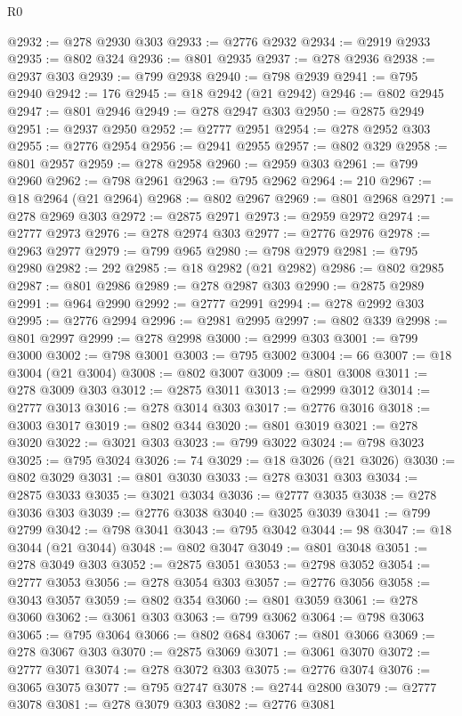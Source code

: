\begin{lexlean}{R0}
\begin{coremodule}
@2932 := @278 @2930 @303
@2933 := @2776 @2932
@2934 := @2919 @2933
@2935 := @802 @324
@2936 := @801 @2935
@2937 := @278 @2936
@2938 := @2937 @303
@2939 := @799 @2938
@2940 := @798 @2939
@2941 := @795 @2940
@2942 := 176
@2945 := @18 @2942 (@21 @2942)
@2946 := @802 @2945
@2947 := @801 @2946
@2949 := @278 @2947 @303
@2950 := @2875 @2949
@2951 := @2937 @2950
@2952 := @2777 @2951
@2954 := @278 @2952 @303
@2955 := @2776 @2954
@2956 := @2941 @2955
@2957 := @802 @329
@2958 := @801 @2957
@2959 := @278 @2958
@2960 := @2959 @303
@2961 := @799 @2960
@2962 := @798 @2961
@2963 := @795 @2962
@2964 := 210
@2967 := @18 @2964 (@21 @2964)
@2968 := @802 @2967
@2969 := @801 @2968
@2971 := @278 @2969 @303
@2972 := @2875 @2971
@2973 := @2959 @2972
@2974 := @2777 @2973
@2976 := @278 @2974 @303
@2977 := @2776 @2976
@2978 := @2963 @2977
@2979 := @799 @965
@2980 := @798 @2979
@2981 := @795 @2980
@2982 := 292
@2985 := @18 @2982 (@21 @2982)
@2986 := @802 @2985
@2987 := @801 @2986
@2989 := @278 @2987 @303
@2990 := @2875 @2989
@2991 := @964 @2990
@2992 := @2777 @2991
@2994 := @278 @2992 @303
@2995 := @2776 @2994
@2996 := @2981 @2995
@2997 := @802 @339
@2998 := @801 @2997
@2999 := @278 @2998
@3000 := @2999 @303
@3001 := @799 @3000
@3002 := @798 @3001
@3003 := @795 @3002
@3004 := 66
@3007 := @18 @3004 (@21 @3004)
@3008 := @802 @3007
@3009 := @801 @3008
@3011 := @278 @3009 @303
@3012 := @2875 @3011
@3013 := @2999 @3012
@3014 := @2777 @3013
@3016 := @278 @3014 @303
@3017 := @2776 @3016
@3018 := @3003 @3017
@3019 := @802 @344
@3020 := @801 @3019
@3021 := @278 @3020
@3022 := @3021 @303
@3023 := @799 @3022
@3024 := @798 @3023
@3025 := @795 @3024
@3026 := 74
@3029 := @18 @3026 (@21 @3026)
@3030 := @802 @3029
@3031 := @801 @3030
@3033 := @278 @3031 @303
@3034 := @2875 @3033
@3035 := @3021 @3034
@3036 := @2777 @3035
@3038 := @278 @3036 @303
@3039 := @2776 @3038
@3040 := @3025 @3039
@3041 := @799 @2799
@3042 := @798 @3041
@3043 := @795 @3042
@3044 := 98
@3047 := @18 @3044 (@21 @3044)
@3048 := @802 @3047
@3049 := @801 @3048
@3051 := @278 @3049 @303
@3052 := @2875 @3051
@3053 := @2798 @3052
@3054 := @2777 @3053
@3056 := @278 @3054 @303
@3057 := @2776 @3056
@3058 := @3043 @3057
@3059 := @802 @354
@3060 := @801 @3059
@3061 := @278 @3060
@3062 := @3061 @303
@3063 := @799 @3062
@3064 := @798 @3063
@3065 := @795 @3064
@3066 := @802 @684
@3067 := @801 @3066
@3069 := @278 @3067 @303
@3070 := @2875 @3069
@3071 := @3061 @3070
@3072 := @2777 @3071
@3074 := @278 @3072 @303
@3075 := @2776 @3074
@3076 := @3065 @3075
@3077 := @795 @2747
@3078 := @2744 @2800
@3079 := @2777 @3078
@3081 := @278 @3079 @303
@3082 := @2776 @3081

\end{coremodule}
\end{lexlean}
